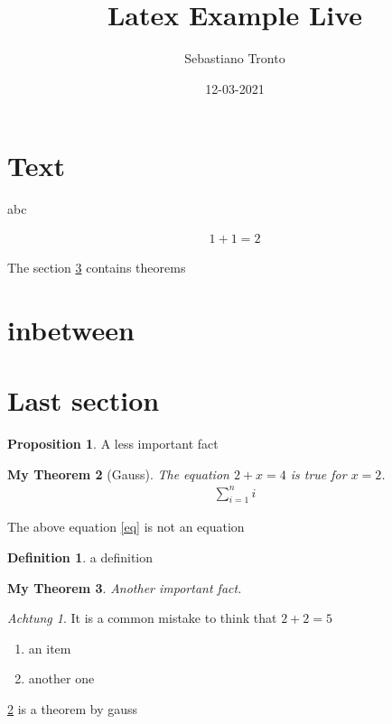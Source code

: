 \documentclass[10pt,a5paper]{article}
\title{Latex Example Live}
\author{Sebastiano Tronto}
\date{12-03-2021}
\newtheorem{mythm}{My Theorem}[section]
\theoremstyle{definition}
\newtheorem{prop}[mythm]{Proposition}
\newtheorem{defi}{Definition}
\theoremstyle{remark}
\newtheorem*{warning}{Achtung}
\numberwithin{equation}{section}
\begin{document}
\maketitle


\section{Text}

abc

\begin{align}
1+1=2
\end{align}

The section \ref{ts} contains theorems

\section{inbetween}

\section{Last section}
\label{ts}


\begin{prop}
A less important fact
\end{prop}

\begin{mythm}[Gauss]
\label{gaussthm}
The equation \(2+x=4\) is true for \(x=2\).
\begin{align}
\label{eq}
\sum_{i=1}^ni
\end{align}
\end{mythm}

The above equation \eqref{eq} is not an equation



\setcounter{defi}{23}
\begin{defi}
a definition
\end{defi}

\setcounter{mythm}{10}
\begin{mythm}
Another important fact.
\end{mythm}

\begin{warning}
It is a common mistake to think that \(2+2=5\)
\end{warning}


\vspace{1cm}

\begin{enumerate}[label=(\Roman*)]
	\item an item
	\item another one
\end{enumerate}


\ref{gaussthm} is a theorem by gauss
\end{document}
